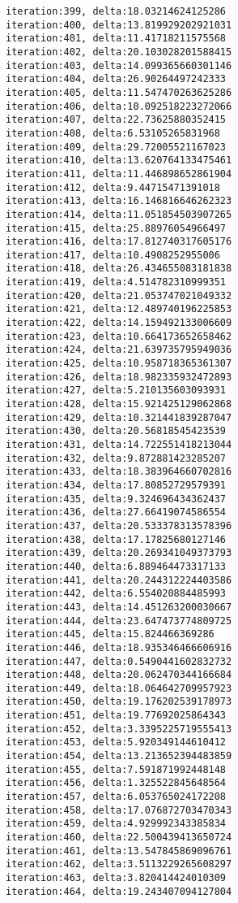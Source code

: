 \documentclass[11pt]{article}
\begin{document}
\begin{Verbatim}[commandchars=\\\{\}]
iteration:399, delta:18.03214624125286
iteration:400, delta:13.819929202921031
iteration:401, delta:11.41718211575568
iteration:402, delta:20.103028201588415
iteration:403, delta:14.099365660301146
iteration:404, delta:26.90264497242333
iteration:405, delta:11.547470263625286
iteration:406, delta:10.092518223272066
iteration:407, delta:22.73625880352415
iteration:408, delta:6.53105265831968
iteration:409, delta:29.72005521167023
iteration:410, delta:13.620764133475461
iteration:411, delta:11.446898652861904
iteration:412, delta:9.44715471391018
iteration:413, delta:16.146816646262323
iteration:414, delta:11.051854503907265
iteration:415, delta:25.88976054966497
iteration:416, delta:17.812740317605176
iteration:417, delta:10.4908252955006
iteration:418, delta:26.434655083181838
iteration:419, delta:4.514782310999351
iteration:420, delta:21.053747021049332
iteration:421, delta:12.489740196225853
iteration:422, delta:14.159492133006609
iteration:423, delta:10.664173652658462
iteration:424, delta:21.639735795949036
iteration:425, delta:10.958718365361307
iteration:426, delta:18.982335932472893
iteration:427, delta:5.210135603093931
iteration:428, delta:15.921425129062868
iteration:429, delta:10.321441839287047
iteration:430, delta:20.56818545423539
iteration:431, delta:14.722551418213044
iteration:432, delta:9.872881423285207
iteration:433, delta:18.383964660702816
iteration:434, delta:17.80852729579391
iteration:435, delta:9.324696434362437
iteration:436, delta:27.66419074586554
iteration:437, delta:20.533378313578396
iteration:438, delta:17.17825680127146
iteration:439, delta:20.269341049373793
iteration:440, delta:6.889464473317133
iteration:441, delta:20.244312224403586
iteration:442, delta:6.554020884485993
iteration:443, delta:14.451263200030667
iteration:444, delta:23.647473774809725
iteration:445, delta:15.824466369286
iteration:446, delta:18.935346466606916
iteration:447, delta:0.5490441602832732
iteration:448, delta:20.062470344166684
iteration:449, delta:18.064642709957923
iteration:450, delta:19.176202539178973
iteration:451, delta:19.77692025864343
iteration:452, delta:3.3395225719555413
iteration:453, delta:5.920349144610412
iteration:454, delta:13.213652394483859
iteration:455, delta:7.591871992448148
iteration:456, delta:1.325522845648564
iteration:457, delta:6.053765024172208
iteration:458, delta:17.076872703470343
iteration:459, delta:4.929992343385834
iteration:460, delta:22.500439413650724
iteration:461, delta:13.547845869096761
iteration:462, delta:3.5113229265608297
iteration:463, delta:3.820414424010309
iteration:464, delta:19.243407094127804

\end{Verbatim}
\end{document}
